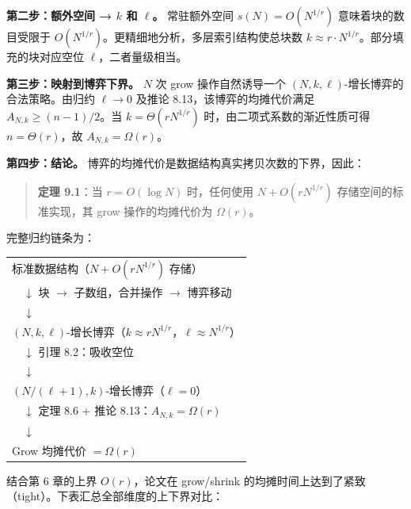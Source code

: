 \documentclass[
  UTF8,
  a4paper,
  12pt]{ctexart}
\begin{document}
\textbf{第二步：额外空间 → \(k\) 和 \(\ell\)。} 常驻额外空间
\(s(N) = O(N^{1/r})\) 意味着块的数目受限于
\(O(N^{1/r})\)。更精细地分析，多层索引结构使总块数
\(k \approx r \cdot N^{1/r}\)。部分填充的块对应空位
\(\ell\)，二者量级相当。

\textbf{第三步：映射到博弈下界。} \(N\) 次 grow 操作自然诱导一个
\((N, k, \ell)\)-增长博弈的合法策略。由归约 \(\ell \to 0\) 及推论
8.13，该博弈的均摊代价满足 \(A_{N,k} \ge (n-1)/2\)。当
\(k = \Theta(rN^{1/r})\) 时，由二项式系数的渐近性质可得
\(n = \Theta(r)\)，故 \(A_{N,k} = \Omega(r)\)。

\textbf{第四步：结论。}
博弈的均摊代价是数据结构真实拷贝次数的下界，因此：

\begin{quote}
\textbf{定理 9.1}：当 \(r=O(\log N)\) 时，任何使用 \(N + O(rN^{1/r})\)
存储空间的标准实现，其 grow 操作的均摊代价为 \(\Omega(r)\)。
\end{quote}

完整归约链条为：

\begin{center}
\begin{tabular}{@{}l@{}}
标准数据结构（\(N + O(rN^{1/r})\) 存储）\\
\(\quad\downarrow\) 块 \(\to\) 子数组，合并操作 \(\to\) 博弈移动\\
\(\quad\downarrow\)\\
\((N, k, \ell)\)-增长博弈（\(k \approx rN^{1/r}\)，\(\ell \approx N^{1/r}\)）\\
\(\quad\downarrow\) 引理 8.2：吸收空位\\
\(\quad\downarrow\)\\
\((N/(\ell+1), k)\)-增长博弈（\(\ell = 0\)）\\
\(\quad\downarrow\) 定理 8.6 + 推论 8.13：\(A_{N,k} = \Omega(r)\)\\
\(\quad\downarrow\)\\
Grow 均摊代价 \(= \Omega(r)\)
\end{tabular}
\end{center}

结合第 6 章的上界 \(O(r)\)，论文在 grow/shrink
的均摊时间上达到了紧致（tight）。下表汇总全部维度的上下界对比：
\end{document}
